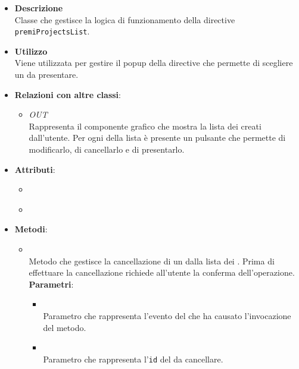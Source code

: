 \FloatBarrier
\begin{itemize}
\item \textbf{Descrizione}\\
Classe che gestisce la logica di funzionamento della directive \texttt{premiProjectsList}.
\item \textbf{Utilizzo}\\
Viene utilizzata per gestire il popup della directive che permette di scegliere un  da presentare.
\item \textbf{Relazioni con altre classi}:
\begin{itemize}
\item \textit{OUT} \hyperref[\nogloxy{Premi::Front-End::Directives::premiProjectsList}]{}\\
Rappresenta il componente grafico che mostra la lista dei  creati dall’utente. Per ogni  della lista è presente un pulsante che permette di modificarlo, di cancellarlo e di presentarlo.
\end{itemize}
\item \textbf{Attributi}:
\begin{itemize}
\item {}
\\ \dpMDDialogServiceField
\item {}
\\ \dpScopeField
\end{itemize}
\item \textbf{Metodi}:
\begin{itemize}
\item {}
\\ Metodo che gestisce la cancellazione di un  dalla lista dei . Prima di effettuare la cancellazione richiede all'utente la conferma dell'operazione.
\\ \textbf{Parametri}:
\begin{itemize}
\item {}
\\ Parametro che rappresenta l'evento del  che ha causato l'invocazione del metodo.
\item {}
\\ Parametro che rappresenta l'\texttt{id} del  da cancellare.
\end{itemize}

\end{itemize}
\end{itemize}
